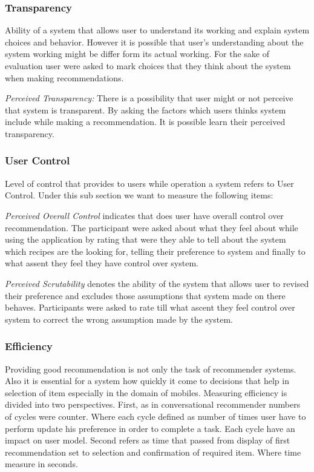 \subsubsection{Transparency}

Ability of a system that allows user to understand its working and explain system choices and behavior. However it is possible that user’s understanding about the system working might be differ form its actual working. For the sake of evaluation user were asked to mark choices that they think about the system when making recommendations. \newline

\textit{Perceived Transparency:} There is a possibility that user might or not perceive that system is transparent. By asking the factors which users thinks system include while making a recommendation. It is possible learn their perceived transparency.


\subsubsection{User Control}
Level of control that provides to users while operation a system refers to User Control. Under this sub section we want to measure the following items:  \newline

\textit{Perceived Overall Control} indicates that does user have overall control over recommendation. The participant were asked about what they feel about while using the application by rating that were they able to tell about the system which recipes are the looking for, telling their preference to system and finally to what assent they feel they have control over system. \newline

\textit{Perceived Scrutability} denotes the ability of the system that allows user to revised their preference and excludes those assumptions that system made on there behaves. Participants were asked to rate till what ascent they feel control over system to correct the wrong assumption made by the system.

\subsubsection{Efficiency}

Providing good recommendation is not only the task of recommender systems. Also it is essential for a system how quickly it come to decisions that help in selection of item especially in the domain of mobiles. Measuring efficiency is divided into two perspectives. First, as in conversational recommender numbers of cycles were counter.  Where each cycle defined as number of times user have to perform update his preference in order to complete a task. Each cycle have an impact on user model. Second refers as time that passed from display of first recommendation set to selection and confirmation of required item. Where time measure in seconds.\newline

